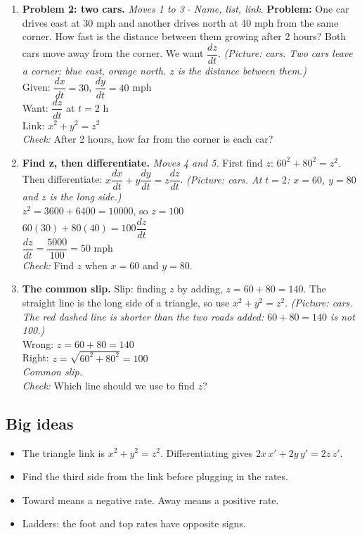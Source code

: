 \documentclass[11pt]{article}
\begin{document}
\begin{enumerate}
\item \textbf{Problem 2: two cars.} \textit{Moves 1 to 3 $\cdot$ Name, list, link.} \textbf{Problem:} One car drives east at 30 mph and another drives north at 40 mph from the same corner. How fast is the distance between them growing after 2 hours? Both cars move away from the corner. We want $\dfrac{dz}{dt}$. \textit{(Picture: cars. Two cars leave a corner: blue east, orange north. $z$ is the distance between them.)}\\ Given: $\dfrac{dx}{dt}=30$, $\dfrac{dy}{dt}=40$ mph\\ Want: $\dfrac{dz}{dt}$ at $t=2$ h\\ Link: $x^2+y^2=z^2$\\ \textit{Check:} After 2 hours, how far from the corner is each car? 
\item \textbf{Find z, then differentiate.} \textit{Moves 4 and 5.} First find $z$: $60^2+80^2=z^2$. Then differentiate: $x\dfrac{dx}{dt}+y\dfrac{dy}{dt}=z\dfrac{dz}{dt}$. \textit{(Picture: cars. At $t=2$: $x=60$, $y=80$ and $z$ is the long side.)}\\ $z^2=3600+6400=10000$, so $z=100$\\ $60(30)+80(40)=100\dfrac{dz}{dt}$\\ $\dfrac{dz}{dt}=\dfrac{5000}{100}=50$ mph\\ \textit{Check:} Find $z$ when $x=60$ and $y=80$. 
\item \textbf{The common slip.} Slip: finding $z$ by adding, $z=60+80=140$. The straight line is the long side of a triangle, so use $x^2+y^2=z^2$. \textit{(Picture: cars. The red dashed line is shorter than the two roads added: $60+80=140$ is not 100.)}\\ Wrong: $z=60+80=140$\\ Right: $z=\sqrt{60^2+80^2}=100$\\ \textit{Common slip.}\\ \textit{Check:} Which line should we use to find $z$? 
\end{enumerate}
\subsection*{Big ideas}\begin{itemize}\item The triangle link is $x^2+y^2=z^2$. Differentiating gives $2x\,x'+2y\,y'=2z\,z'$.
\item Find the third side from the link before plugging in the rates.
\item Toward means a negative rate. Away means a positive rate.
\item Ladders: the foot and top rates have opposite signs.\end{itemize}
\end{document}
